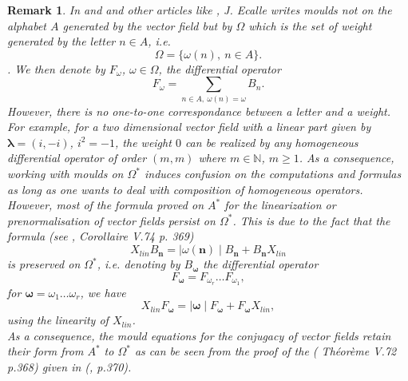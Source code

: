 \documentclass[english,11pt]{amsart}
\newtheorem{remark}{Remark}
\def\nn{\mathbf{n}}
\def\N{\mathbb{N}}
\def\di{\displaystyle}
\def\nn{\mathbf{n}}
\def\oo{\boldsymbol\omega}
\begin{document}
\begin{remark}
    In \cite{es} and \cite{ev} and other articles like \cite{ec1,ec2}, J. Ecalle writes moulds not on the alphabet $A$ generated by the vector field but by $\Omega$ which is the set of weight generated by the letter $n\in A$, i.e. 
    \begin{equation}
        \Omega =\{ \omega (n),\ n \in A \} .
    \end{equation}. 
We then denote by $F_{\omega}$, $\omega \in \Omega$, the differential operator
\begin{equation}
    F_{\omega} =\di\sum_{n\in A,\ \omega (n)=\omega} B_n .
\end{equation}
    However, there is no one-to-one correspondance between a letter and a weight. For example, for a two dimensional vector field with a linear part given by $\mathbf{\lambda} =(i,-i )$, $i^2 =-1$, the weight $0$ can be realized by any homogeneous differential operator of order $(m , m)$ where $m\in \N$, $m\geq 1$. As a consequence, working with moulds on $\Omega^*$ induces confusion on the computations and formulas as long as one wants to deal with composition of homogeneous operators. \\

    However, most of the formula proved on $A^*$ for the linearization or prenormalisation of vector fields persist on $\Omega^*$. This is due to the fact that the formula (see \cite{cr2}, Corollaire V.74 p. 369)
    \begin{equation}
        X_{lin} B_{\nn}  =\mid \omega (\nn ) \mid B_{\nn} + B_{\nn} X_{lin} 
    \end{equation}
    is preserved on $\Omega^*$, i.e. denoting by $B_{\oo}$ the differential operator 
    \begin{equation}
        F_{\oo} =F_{\omega_r} \dots F_{\omega _1} , 
    \end{equation}
    for $\oo =\omega_1 \dots \omega _r$, we have 
    \begin{equation}
        X_{lin} F_{\oo} =\mid \oo \mid F_{\oo} + F_{\oo} X_{lin} ,
    \end{equation}
    using the linearity of $X_{lin}$. \\
    
    As a consequence, the mould equations for the conjugacy of vector fields retain their form from $A^*$ to $\Omega^*$ as can be seen from the proof of the (\cite{cr2} Théorème V.72 p.368) given in (\cite{cr2}, p.370).
\end{remark}
\end{document}
